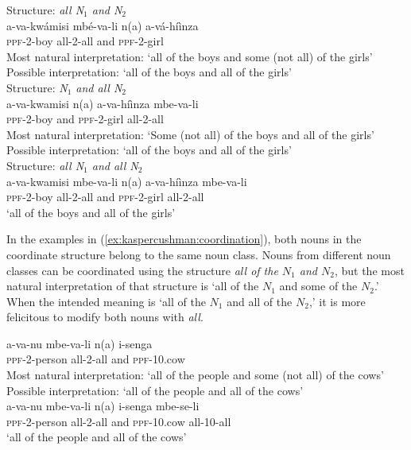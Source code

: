 \documentclass[output=paper,modfonts,nonflat]{langsci/langscibook}
\begin{document}
\begin{exe} 

\ex \begin{xlist} \label{ex:kaspercushman:coordination}

\ex Structure: \emph{all N$_{1}$ and N$_{2}$}\\
\gll a-va-kwámisi mbé-va-li n(a)	a-vá-hí\`inza \label{ex:kaspercushman:allboysgirls}\\  
\textsc{ppf}-2-boy all-2-all and \textsc{ppf}-2-girl \\
\glt Most natural interpretation: `all of the boys and some (not all) of the girls' \\
    Possible interpretation: `all of the boys and all of the girls' \\
\ex  Structure: \emph{N$_{1}$ and all N$_{2}$}\\
\gll a-va-kwamisi n(a) a-va-hí\`inza mbe-va-li \label{ex:kaspercushman:allgirls}  \\  
\textsc{ppf}-2-boy and \textsc{ppf}-2-girl all-2-all\\
\glt Most natural interpretation: `Some (not all) of the boys and all of the girls' \\
Possible interpretation: `all of the boys and all of the girls' \\
\ex  Structure: \emph{all N$_{1}$ and all N$_{2}$} \\
\gll a-va-kwamisi mbe-va-li n(a) a-va-hí\`inza mbe-va-li  \label{ex:kaspercushman:allboysallgirls} \\  
\textsc{ppf}-2-boy all-2-all  and \textsc{ppf}-2-girl all-2-all\\
\glt `all of the boys and all of the girls' \\
\end{xlist}
\end{exe} 

In the examples in (\ref{ex:kaspercushman:coordination}), both nouns in the coordinate structure belong to the same noun class. Nouns from different noun classes can be coordinated using the structure \textit{all of the $N_{1}$ and $N_{2}$}, but the most natural interpretation of that structure is `all of the $N_{1}$ and some of the $N_{2}$.'  When the intended meaning is `all of the $N_{1}$ and all of the $N_{2}$,' it is more felicitous to modify both nouns with \textit{all}.  

\begin{exe}
\ex \begin{xlist}
\ex 
\gll a-va-nu mbe-va-li n(a) i-senga \\
\textsc{ppf}-2-person all-2-all and \textsc{ppf}-10.cow \\
\glt Most natural interpretation: `all of the people and some (not all) of the cows' \\
Possible interpretation: `all of the people and all of the cows' \\
\ex 
\gll a-va-nu mbe-va-li n(a) i-senga mbe-se-li \\
\textsc{ppf}-2-person all-2-all and \textsc{ppf}-10.cow all-10-all \\
\glt `all of the people and all of the cows' 
\end{xlist}
\end{exe}
\end{document}
